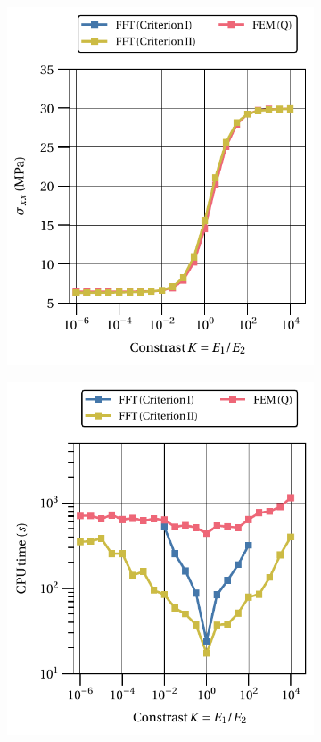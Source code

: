 \begin{figure}[hbt]
\centering
	\begin{subfigure}[b]{0.49\textwidth}
    \centering
    \includegraphics[width=\textwidth]{figures/svk_2D_normal_stress_avg_vs_stiff_ratio}
    \caption{}
    \label{subfig:svk_2D_normal_stress_avg_vs_stiff_ratio}
  \end{subfigure}
  \begin{subfigure}[b]{0.49\textwidth}
    \centering
    \includegraphics[width=\textwidth]{figures/svk_2D_normal_stress_avg_cpu_time_vs_n_voxels}

\end{subfigure}
\end{figure}
